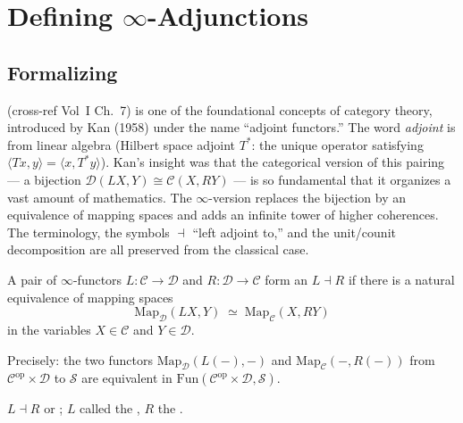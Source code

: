 \section{Defining $\infty$-Adjunctions}
\label{sec:defining-adjunctions}

\subsection{Formalizing}

\begin{nameorigin}
 (cross-ref Vol~I Ch.~7) is one of the foundational
concepts of category theory, introduced by Kan (1958) under the
name ``adjoint functors.'' The word \emph{adjoint} is from linear
algebra (Hilbert space adjoint $T^*$: the unique operator satisfying
$\langle Tx, y\rangle = \langle x, T^*y\rangle$). Kan's insight was
that the categorical version of this pairing — a bijection
$\mathcal{D}(L X, Y) \cong \mathcal{C}(X, R Y)$ — is so fundamental
that it organizes a vast amount of mathematics. The $\infty$-version
replaces the bijection by an equivalence of mapping spaces and adds an
infinite tower of higher coherences. The terminology, the symbols
$\dashv$ ``left adjoint to,'' and the unit/counit decomposition are
all preserved from the classical case.
\end{nameorigin}

\begin{definition}
\label{def:adjunction-hom}
A pair of $\infty$-functors $L : \mathcal{C} \to \mathcal{D}$ and
$R : \mathcal{D} \to \mathcal{C}$ form an 
$L \dashv R$ if there is a natural equivalence of mapping spaces
\begin{equation*}
  \mathrm{Map}_\mathcal{D}(L X, Y) \;\simeq\; \mathrm{Map}_\mathcal{C}(X, R Y)
\end{equation*}
in the variables $X \in \mathcal{C}$ and $Y \in \mathcal{D}$.

Precisely: the two functors $\mathrm{Map}_\mathcal{D}(L (-), -)$ and
$\mathrm{Map}_\mathcal{C}(-, R(-))$ from $\mathcal{C}^{\mathrm{op}} \times
\mathcal{D}$ to $\mathcal{S}$ are equivalent in
$\mathrm{Fun}(\mathcal{C}^{\mathrm{op}} \times \mathcal{D}, \mathcal{S})$.
\end{definition}

\begin{howtosay}
$L \dashv R$  or ; $L$ called the , $R$ the
.
\end{howtosay}

